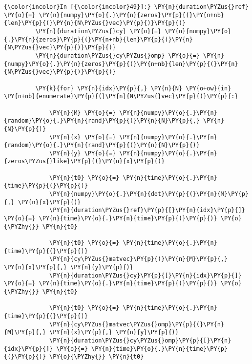     \begin{Verbatim}[commandchars=\\\{\}]
{\color{incolor}In [{\color{incolor}49}]:} \PY{n}{duration\PYZus{}ref} \PY{o}{=} \PY{n}{numpy}\PY{o}{.}\PY{n}{zeros}\PY{p}{(}\PY{n+nb}{len}\PY{p}{(}\PY{n}{N\PYZus{}vec}\PY{p}{)}\PY{p}{)}
         \PY{n}{duration\PYZus{}cy} \PY{o}{=} \PY{n}{numpy}\PY{o}{.}\PY{n}{zeros}\PY{p}{(}\PY{n+nb}{len}\PY{p}{(}\PY{n}{N\PYZus{}vec}\PY{p}{)}\PY{p}{)}
         \PY{n}{duration\PYZus{}cy\PYZus{}omp} \PY{o}{=} \PY{n}{numpy}\PY{o}{.}\PY{n}{zeros}\PY{p}{(}\PY{n+nb}{len}\PY{p}{(}\PY{n}{N\PYZus{}vec}\PY{p}{)}\PY{p}{)}
         
         \PY{k}{for} \PY{n}{idx}\PY{p}{,} \PY{n}{N} \PY{o+ow}{in} \PY{n+nb}{enumerate}\PY{p}{(}\PY{n}{N\PYZus{}vec}\PY{p}{)}\PY{p}{:}
             
             \PY{n}{M} \PY{o}{=} \PY{n}{numpy}\PY{o}{.}\PY{n}{random}\PY{o}{.}\PY{n}{rand}\PY{p}{(}\PY{n}{N}\PY{p}{,} \PY{n}{N}\PY{p}{)}
             \PY{n}{x} \PY{o}{=} \PY{n}{numpy}\PY{o}{.}\PY{n}{random}\PY{o}{.}\PY{n}{rand}\PY{p}{(}\PY{n}{N}\PY{p}{)}
             \PY{n}{y} \PY{o}{=} \PY{n}{numpy}\PY{o}{.}\PY{n}{zeros\PYZus{}like}\PY{p}{(}\PY{n}{x}\PY{p}{)}
             
             \PY{n}{t0} \PY{o}{=} \PY{n}{time}\PY{o}{.}\PY{n}{time}\PY{p}{(}\PY{p}{)}
             \PY{n}{numpy}\PY{o}{.}\PY{n}{dot}\PY{p}{(}\PY{n}{M}\PY{p}{,} \PY{n}{x}\PY{p}{)}
             \PY{n}{duration\PYZus{}ref}\PY{p}{[}\PY{n}{idx}\PY{p}{]} \PY{o}{=} \PY{n}{time}\PY{o}{.}\PY{n}{time}\PY{p}{(}\PY{p}{)} \PY{o}{\PYZhy{}} \PY{n}{t0}
             
             \PY{n}{t0} \PY{o}{=} \PY{n}{time}\PY{o}{.}\PY{n}{time}\PY{p}{(}\PY{p}{)}
             \PY{n}{cy\PYZus{}matvec}\PY{p}{(}\PY{n}{M}\PY{p}{,} \PY{n}{x}\PY{p}{,} \PY{n}{y}\PY{p}{)}
             \PY{n}{duration\PYZus{}cy}\PY{p}{[}\PY{n}{idx}\PY{p}{]} \PY{o}{=} \PY{n}{time}\PY{o}{.}\PY{n}{time}\PY{p}{(}\PY{p}{)} \PY{o}{\PYZhy{}} \PY{n}{t0}
             
             \PY{n}{t0} \PY{o}{=} \PY{n}{time}\PY{o}{.}\PY{n}{time}\PY{p}{(}\PY{p}{)}
             \PY{n}{cy\PYZus{}matvec\PYZus{}omp}\PY{p}{(}\PY{n}{M}\PY{p}{,} \PY{n}{x}\PY{p}{,} \PY{n}{y}\PY{p}{)}
             \PY{n}{duration\PYZus{}cy\PYZus{}omp}\PY{p}{[}\PY{n}{idx}\PY{p}{]} \PY{o}{=} \PY{n}{time}\PY{o}{.}\PY{n}{time}\PY{p}{(}\PY{p}{)} \PY{o}{\PYZhy{}} \PY{n}{t0}
\end{Verbatim}


